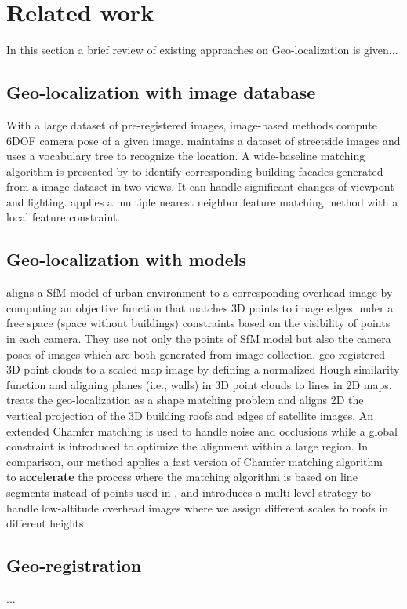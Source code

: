 
%
\section{Related work}
In this section a brief review of existing approaches on Geo-localization is given...
%
\subsection{Geo-localization with image database}

With a large dataset of pre-registered images, image-based methods compute 6DOF camera pose of a given image. 
\cite{Schindler2007} maintains a dataset of streetside images and uses a vocabulary tree to recognize the location. 
A wide-baseline matching algorithm is presented by \cite{Robertson2004} to identify corresponding building facades generated from a image dataset in two views. It can handle significant changes of viewpont and lighting. \cite{Zamir2014} applies a multiple nearest neighbor feature matching method with a local feature constraint. 
%


\subsection{Geo-localization with models}
\cite{Kaminsky2009} aligns a SfM model of urban environment to a corresponding overhead image by computing an objective function that matches 3D points to image edges under a free space (space without buildings) constraints based on the visibility of points in each camera. 
They use not only the points of SfM model but also the camera poses of images which are both generated from image collection.
\cite{Crews2013} geo-registered 3D point clouds to a scaled map image by defining a normalized Hough similarity function and aligning planes (i.e., walls) in 3D point clouds to lines in 2D maps.
\cite{ECDM} treats the geo-localization as a shape matching problem and aligns 2D the vertical projection of the 3D building roofs and edges of satellite images. An extended Chamfer matching is used to handle noise and occlusions while a global constraint is introduced to optimize the alignment within a large region.
%
In comparison, our method applies a fast version of Chamfer matching algorithm~\cite{FDCM} to \textbf{accelerate} the process where the matching algorithm is based on line segments instead of  points used in \cite{ECDM}, and introduces a multi-level strategy to handle low-altitude overhead images where we assign different scales to roofs in different heights. 
%
\subsection{Geo-registration}
...
%